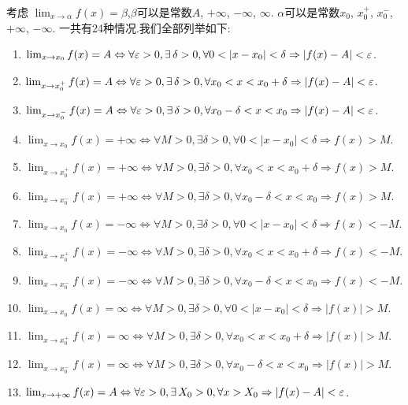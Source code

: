 考虑 $\lim_{x \to \alpha} f(x) = \beta $,$\beta$可以是常数$A$, $+\infty$, $-\infty$, $\infty$. $\alpha$可以是常数$x_0$, $x_0^+$, $x_0^-$, $+\infty$, $-\infty$. 一共有24种情况.我们全部列举如下:

\begin{enumerate}[(1)]
    \item $\lim_{x \to x_0} f(x) = A \Leftrightarrow \forall \ve >0, \exists \delta >0, \forall 0<|x-x_0|<\delta \Rightarrow |f(x)-A|<\ve$.
    \item $\lim_{x \to x_0^+} f(x) = A \Leftrightarrow \forall \ve >0, \exists \delta >0, \forall x_0<x<x_0+\delta \Rightarrow |f(x)-A|<\ve$.
    \item $\lim_{x \to x_0^-} f(x) = A \Leftrightarrow \forall \ve >0, \exists \delta >0, \forall x_0-\delta<x<x_0 \Rightarrow |f(x)-A|<\ve$.
    \item $\lim_{x \to x_0} f(x)= + \infty \Leftrightarrow \forall M>0, \exists \delta >0, \forall 0<|x-x_0|<\delta \Rightarrow f(x)>M$.
    \item $\lim_{x \to x_0^+} f(x)= + \infty \Leftrightarrow \forall M>0, \exists \delta >0, \forall x_0<x<x_0+\delta \Rightarrow f(x)>M$.
    \item $\lim_{x \to x_0^-} f(x)= + \infty \Leftrightarrow \forall M>0, \exists \delta >0, \forall x_0-\delta<x<x_0 \Rightarrow f(x)>M$.
    \item $\lim_{x \to x_0} f(x)= - \infty \Leftrightarrow \forall M>0, \exists \delta >0, \forall 0<|x-x_0|<\delta \Rightarrow f(x)<-M$.
    \item $\lim_{x \to x_0^+} f(x)= - \infty \Leftrightarrow \forall M>0, \exists \delta >0, \forall x_0<x<x_0+\delta \Rightarrow f(x)<-M$.
    \item $\lim_{x \to x_0^-} f(x)= - \infty \Leftrightarrow \forall M>0, \exists \delta >0, \forall x_0-\delta<x<x_0 \Rightarrow f(x)<-M$.
    \item $\lim_{x \to x_0} f(x)= \infty \Leftrightarrow \forall M>0, \exists \delta >0, \forall 0<|x-x_0|<\delta \Rightarrow |f(x)|>M$.
    \item $\lim_{x \to x_0^+} f(x)= \infty \Leftrightarrow \forall M>0, \exists \delta >0, \forall x_0<x<x_0+\delta \Rightarrow |f(x)|>M$.
    \item $\lim_{x \to x_0^-} f(x)= \infty \Leftrightarrow \forall M>0, \exists \delta >0, \forall x_0-\delta<x<x_0 \Rightarrow |f(x)|>M$.
    \item $\lim_{x \to +\infty} f(x) = A \Leftrightarrow \forall \ve >0, \exists X_0 >0, \forall x>X_0 \Rightarrow |f(x)-A|<\ve$.

\end{enumerate}
